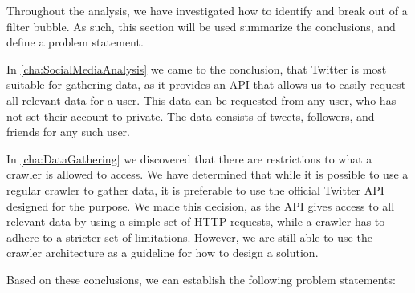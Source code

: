 
Throughout the analysis, we have investigated how to identify and break out of a
filter bubble. As such, this section will be used summarize the conclusions, and
define a problem statement.\nl

In \autoref{cha:SocialMediaAnalysis} we came to the conclusion, that Twitter is
most suitable for gathering data, as it provides an \ac{API} that allows us to
easily request all relevant data for a user. This data can be requested from any
user, who has not set their account to private. The data consists of tweets,
followers, and friends for any such user.\nl

In \autoref{cha:DataGathering} we discovered that there are restrictions to what
a crawler is allowed to access. We have determined that while it is possible to
use a regular crawler to gather data, it is preferable to use the official
Twitter \ac{API} designed for the purpose. We made this decision, as the
\ac{API} gives access to all relevant data by using a simple set of \ac{HTTP}
requests, while a crawler has to adhere to a stricter set of limitations.
However, we are still able to use the crawler architecture as a guideline for
how to design a solution.\nl





Based on these conclusions, we can establish the following problem statements:

\begin{center}
\begin{minipage}{0.95\linewidth} 


\end{minipage}
\end{center}




